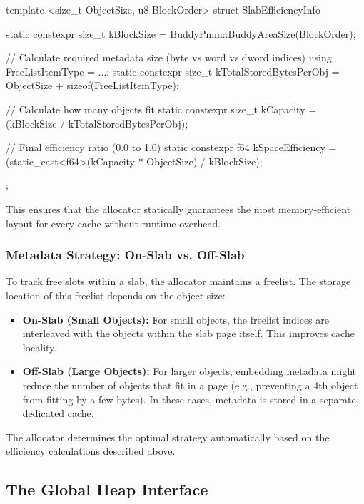 \documentclass[a4paper,10pt,twoside]{report}
\theoremstyle{definition}
\begin{document}
\begin{cppcode}[caption={Compile-Time Slab Efficiency Calculation}, label={lst:slab_efficiency}]
template <size_t ObjectSize, u8 BlockOrder>
struct SlabEfficiencyInfo {
    static constexpr size_t kBlockSize = BuddyPmm::BuddyAreaSize(BlockOrder);
    
    // Calculate required metadata size (byte vs word vs dword indices)
    using FreeListItemType = ...; 
    static constexpr size_t kTotalStoredBytesPerObj = 
        ObjectSize + sizeof(FreeListItemType);

    // Calculate how many objects fit
    static constexpr size_t kCapacity = 
        (kBlockSize / kTotalStoredBytesPerObj);

    // Final efficiency ratio (0.0 to 1.0)
    static constexpr f64 kSpaceEfficiency =
        (static_cast<f64>(kCapacity * ObjectSize) / kBlockSize);
};
\end{cppcode}

This ensures that the allocator statically guarantees the most memory-efficient layout for every cache without runtime overhead.

\subsubsection{Metadata Strategy: On-Slab vs. Off-Slab}

To track free slots within a slab, the allocator maintains a freelist. The storage location of this freelist depends on the object size:

\begin{itemize}
    \item \textbf{On-Slab (Small Objects):} For small objects, the freelist indices are interleaved with the objects within the slab page itself. This improves cache locality.
    \item \textbf{Off-Slab (Large Objects):} For larger objects, embedding metadata might reduce the number of objects that fit in a page (e.g., preventing a 4th object from fitting by a few bytes). In these cases, metadata is stored in a separate, dedicated cache.
\end{itemize}

The allocator determines the optimal strategy automatically based on the efficiency calculations described above.

\subsection{The Global Heap Interface}
\end{document}
